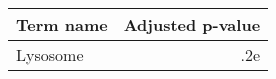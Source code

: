 \begin{tabular}{lr}
\toprule
Term name &  Adjusted p-value \\
\midrule
 Lysosome &               .2e \\
\bottomrule
\end{tabular}
